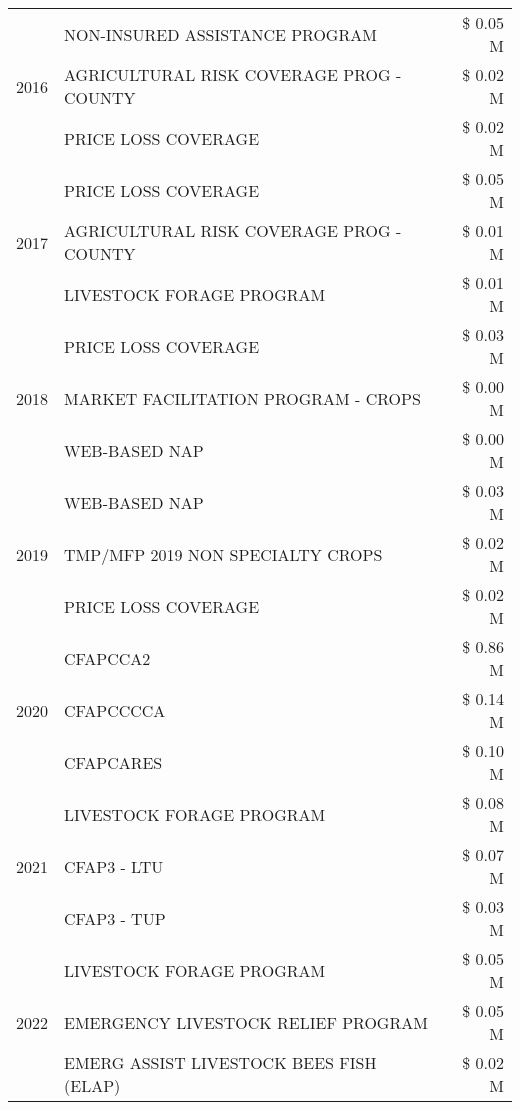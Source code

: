 \begin{tabular}{llr}
\cline{1-3}
\multirow[t]{3}{*}{2016} & NON-INSURED ASSISTANCE PROGRAM & \$ 0.05 M \\
 & AGRICULTURAL RISK COVERAGE PROG - COUNTY & \$ 0.02 M \\
 & PRICE LOSS COVERAGE & \$ 0.02 M \\
\cline{1-3}
\multirow[t]{3}{*}{2017} & PRICE LOSS COVERAGE & \$ 0.05 M \\
 & AGRICULTURAL RISK COVERAGE PROG - COUNTY & \$ 0.01 M \\
 & LIVESTOCK FORAGE PROGRAM & \$ 0.01 M \\
\cline{1-3}
\multirow[t]{3}{*}{2018} & PRICE LOSS COVERAGE & \$ 0.03 M \\
 & MARKET FACILITATION PROGRAM - CROPS & \$ 0.00 M \\
 & WEB-BASED NAP & \$ 0.00 M \\
\cline{1-3}
\multirow[t]{3}{*}{2019} & WEB-BASED NAP & \$ 0.03 M \\
 & TMP/MFP 2019 NON SPECIALTY CROPS & \$ 0.02 M \\
 & PRICE LOSS COVERAGE & \$ 0.02 M \\
\cline{1-3}
\multirow[t]{3}{*}{2020} & CFAPCCA2 & \$ 0.86 M \\
 & CFAPCCCCA & \$ 0.14 M \\
 & CFAPCARES & \$ 0.10 M \\
\cline{1-3}
\multirow[t]{3}{*}{2021} & LIVESTOCK FORAGE PROGRAM & \$ 0.08 M \\
 & CFAP3 - LTU & \$ 0.07 M \\
 & CFAP3 - TUP & \$ 0.03 M \\
\cline{1-3}
\multirow[t]{3}{*}{2022} & LIVESTOCK FORAGE PROGRAM & \$ 0.05 M \\
 & EMERGENCY LIVESTOCK RELIEF PROGRAM & \$ 0.05 M \\
 & EMERG ASSIST LIVESTOCK BEES FISH (ELAP) & \$ 0.02 M \\
\cline{1-3}
\bottomrule
\end{tabular}
